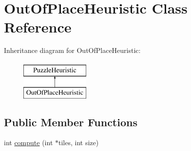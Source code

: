 \hypertarget{classOutOfPlaceHeuristic}{\section{\-Out\-Of\-Place\-Heuristic \-Class \-Reference}
\label{classOutOfPlaceHeuristic}
}
\-Inheritance diagram for \-Out\-Of\-Place\-Heuristic\-:\begin{figure}[H]
\begin{center}
\leavevmode
\includegraphics[height=2.000000cm]{classOutOfPlaceHeuristic}
\end{center}
\end{figure}
\subsection*{\-Public \-Member \-Functions}
\begin{DoxyCompactItemize}
\item 
int \hyperlink{classOutOfPlaceHeuristic_acc042925c642807a995a18ee3393098d}{compute} (int $\ast$tiles, int size)
\end{DoxyCompactItemize}



